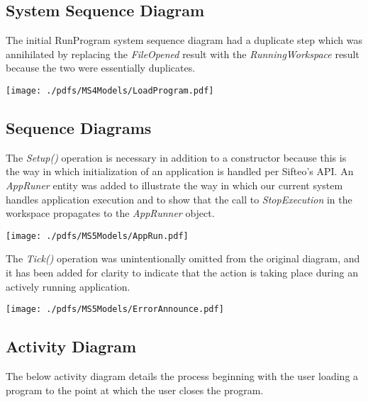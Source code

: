 \documentclass[12pt]{article}
\begin{document}
\subsection{System Sequence Diagram}

The initial RunProgram system sequence diagram had a duplicate step which was annihilated by replacing the \textit{FileOpened} result with the \textit{RunningWorkspace} result because the two were essentially duplicates.

\begin{center}
        \texttt{[image: ./pdfs/MS4Models/LoadProgram.pdf]}
\end{center}

\clearpage

\subsection{Sequence Diagrams}

The \textit{Setup()} operation is necessary in addition to a constructor because this is the way in which initialization of an application is handled per Sifteo's API. An \textit{AppRuner} entity was added to illustrate the way in which our current system handles application execution and to show that the call to \textit{StopExecution} in the workspace propagates to the \textit{AppRunner} object.

\begin{center}
        \texttt{[image: ./pdfs/MS5Models/AppRun.pdf]}
\end{center}

\clearpage

The \textit{Tick()} operation was unintentionally omitted from the original diagram, and it has been added for clarity to indicate that the action is taking place during an actively running application.

\begin{center}
        \texttt{[image: ./pdfs/MS5Models/ErrorAnnounce.pdf]}
\end{center}

\clearpage

\subsection{Activity Diagram}

The below activity diagram details the process beginning with the user loading a program to the point at which the user closes the program.
\end{document}
